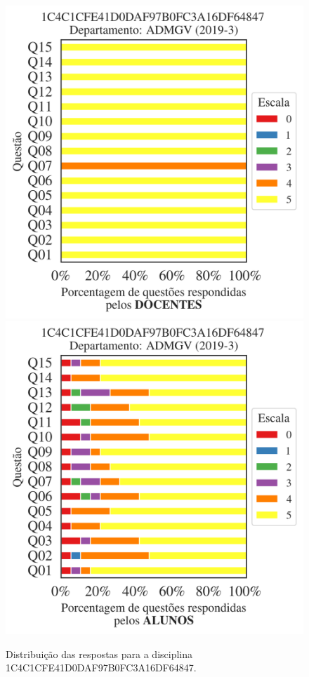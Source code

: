 \documentclass[a4paper,10pt]{article}
\begin{document}
\begin{figure}[h]
\centering
\includegraphics[width=0.485\linewidth]{analise_disciplina_departamento_ADMGV_1C4C1CFE41D0DAF97B0FC3A16DF64847_docentes.png}
\includegraphics[width=0.485\linewidth]{analise_disciplina_departamento_ADMGV_1C4C1CFE41D0DAF97B0FC3A16DF64847_alunos.png}
\caption{\label{fig:analise_geral_departamento}                Distribuição das respostas para a disciplina 1C4C1CFE41D0DAF97B0FC3A16DF64847. }
\end{figure}
\end{document}
